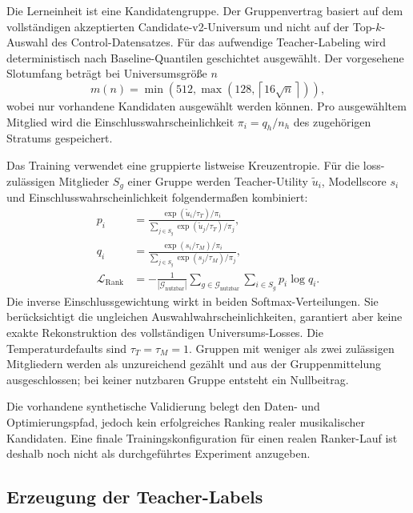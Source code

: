 Die Lerneinheit ist eine Kandidatengruppe. Der Gruppenvertrag basiert auf dem vollständigen akzeptierten Candidate-v2-Universum und nicht auf der Top-$k$-Auswahl des Control-Datensatzes. Für das aufwendige Teacher-Labeling wird deterministisch nach Baseline-Quantilen geschichtet ausgewählt. Der vorgesehene Slotumfang beträgt bei Universumsgröße $n$
\begin{equation}
 m(n)=\min\!\left(512,\max\!\left(128,\left\lceil16\sqrt{n}\right\rceil\right)\right),
\end{equation}
wobei nur vorhandene Kandidaten ausgewählt werden können. Pro ausgewähltem Mitglied wird die Einschlusswahrscheinlichkeit $\pi_i=q_h/n_h$ des zugehörigen Stratums gespeichert.

Das Training verwendet eine gruppierte listweise Kreuzentropie. Für die loss-zulässigen Mitglieder $S_g$ einer Gruppe werden Teacher-Utility $\tilde u_i$, Modellscore $s_i$ und Einschlusswahrscheinlichkeit folgendermaßen kombiniert:
\begin{align}
 p_i &= \frac{\exp(\tilde u_i/\tau_T)/\pi_i}
                 {\sum_{j\in S_g}\exp(\tilde u_j/\tau_T)/\pi_j},\\
 q_i &= \frac{\exp(s_i/\tau_M)/\pi_i}
                 {\sum_{j\in S_g}\exp(s_j/\tau_M)/\pi_j},\\
 \mathcal{L}_{\mathrm{Rank}}
     &= -\frac{1}{|\mathcal{G}_{\mathrm{nutzbar}}|}
        \sum_{g\in\mathcal{G}_{\mathrm{nutzbar}}}\sum_{i\in S_g}p_i\log q_i.
\end{align}
Die inverse Einschlussgewichtung wirkt in beiden Softmax-Verteilungen. Sie berücksichtigt die ungleichen Auswahlwahrscheinlichkeiten, garantiert aber keine exakte Rekonstruktion des vollständigen Universums-Losses. Die Temperaturdefaults sind $\tau_T=\tau_M=1$. Gruppen mit weniger als zwei zulässigen Mitgliedern werden als unzureichend gezählt und aus der Gruppenmittelung ausgeschlossen; bei keiner nutzbaren Gruppe entsteht ein Nullbeitrag.

Die vorhandene synthetische Validierung belegt den Daten- und Optimierungspfad, jedoch kein erfolgreiches Ranking realer musikalischer Kandidaten. Eine finale Trainingskonfiguration für einen realen Ranker-Lauf ist deshalb noch nicht als durchgeführtes Experiment anzugeben.

\subsection{Erzeugung der Teacher-Labels}
\label{sec:methodik-teacher}

